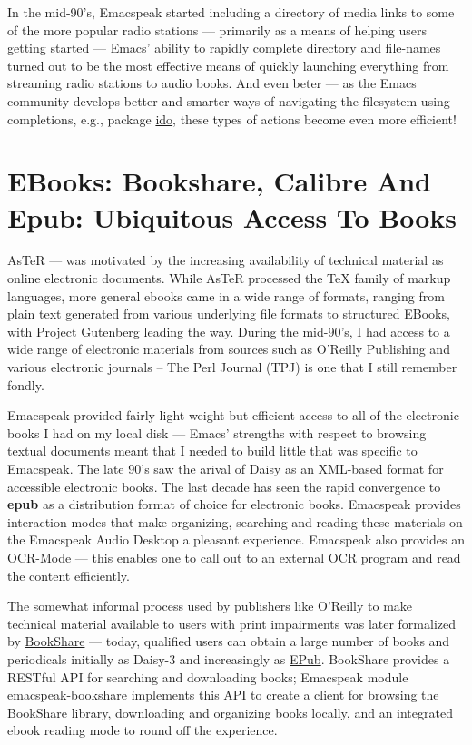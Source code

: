 \documentclass[11pt]{article}
\begin{document}
In the mid-90's, Emacspeak started including a directory of media
links to some of the more popular radio stations — primarily as a
means of helping users getting started — Emacs' ability to
rapidly complete directory and file-names turned out to be the
most effective means of quickly launching everything from
streaming radio stations to audio books. And even beter — as the
Emacs community develops better and smarter ways of navigating
the filesystem using completions, e.g., package \uline{ido}, these
types of actions become even more efficient!

\section{EBooks: Bookshare, Calibre And Epub: Ubiquitous Access To Books}
\label{sec-11}


AsTeR — was motivated by the increasing availability of technical
material as online electronic documents. While AsTeR processed
the \TeX{} family of markup languages, more general ebooks came in a
wide range of formats, ranging from plain text generated from
various underlying file formats to structured EBooks, with
Project \href{http://www.gutenberg.org/}{Gutenberg} leading the way. During the mid-90's, I had
access to a wide range of electronic materials from sources such
as O'Reilly Publishing and various electronic journals -- The
Perl Journal (TPJ) is one that I still remember fondly. 

Emacspeak provided fairly light-weight but efficient access to
all of the electronic books I had on my local disk — Emacs'
strengths with respect to browsing textual documents meant that I
needed to build little that was specific to Emacspeak. The late
90's saw the arival of Daisy as an XML-based format for
accessible electronic books. The last decade has seen the rapid
convergence to \textbf{epub} as a distribution format of choice for
electronic books. Emacspeak provides interaction modes that make
organizing, searching and reading these materials on the
Emacspeak Audio Desktop a pleasant experience. Emacspeak also
provides an OCR-Mode — this enables one to call out to an
external OCR program and read the content efficiently.

The somewhat informal process used by publishers like O'Reilly to
make technical material available to users with print impairments
was later formalized by \href{https://www.bookshare.org/#mainContent}{BookShare} — today, qualified users can
obtain a large number of books and periodicals initially as
Daisy-3 and increasingly as \uline{EPub}. BookShare provides a RESTful
API for searching and downloading books; Emacspeak module
\uline{emacspeak-bookshare} implements this API to create a client for
browsing the BookShare library, downloading and organizing books
locally, and an integrated ebook  reading mode to round off the
experience.
\end{document}
